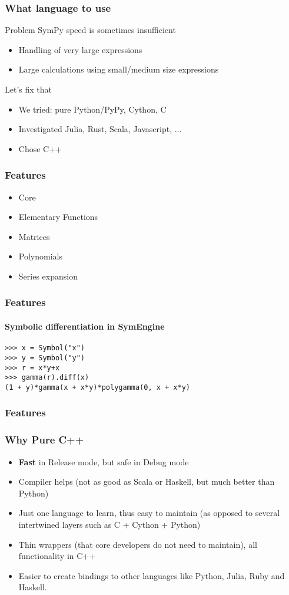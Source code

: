 \documentclass{beamer}
\begin{document}
\begin{frame}
\frametitle{What language to use}
\begin{block}{Problem}
SymPy speed is sometimes insufficient
\begin{itemize}
\item Handling of very large expressions
\item Large calculations using small/medium size expressions
\end{itemize}
\end{block}

\begin{block}{Let's fix that}
\begin{itemize}
\item We tried: pure Python/PyPy, Cython, C
\item Investigated Julia, Rust, Scala, Javascript, ...
\item Chose C++
\end{itemize}
\end{block}
\end{frame}




\begin{frame}
\frametitle{Features}
\begin{itemize}
    \item Core
    \item Elementary Functions
    \item Matrices
    \item Polynomials
    \item Series expansion
\end{itemize}
\end{frame}


\begin{frame}[fragile]
\frametitle{Features}
\framesubtitle{Symbolic differentiation in SymEngine}
\begin{verbatim}
>>> x = Symbol("x")
>>> y = Symbol("y")
>>> r = x*y+x
>>> gamma(r).diff(x)
(1 + y)*gamma(x + x*y)*polygamma(0, x + x*y)
\end{verbatim}
\end{frame}


\begin{frame}
\frametitle{Features}
\end{frame}

\begin{frame}
\frametitle{Why Pure C++}
\begin{itemize}
\item \textbf{Fast} in Release mode, but safe in Debug mode
\item Compiler helps (not as good as Scala or Haskell, but much better than
    Python)
\item Just one language to learn, thus easy to maintain (as opposed to several
    intertwined layers such as C + Cython + Python)
\item Thin wrappers (that core developers do not need to maintain), all functionality in C++
\item Easier to create bindings to other languages like Python, Julia, Ruby and Haskell.
\end{itemize}
\end{frame}
\end{document}

